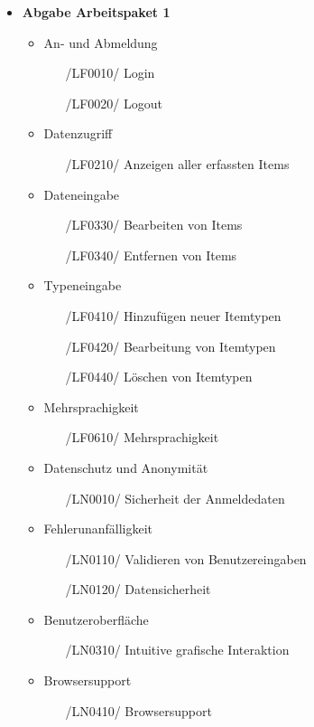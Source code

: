\documentclass[11pt,a4paper]{report}
\begin{document}
\begin{itemize}
\item
  \textbf{Abgabe Arbeitspaket 1}
  
  \begin{itemize}
  	\item
  		An- und Abmeldung
  		\begin{itemize}
  		\leftskip=3em
  		\item[/LF0010/] Login
  		\item[/LF0020/] Logout
  		\end{itemize}
    \item
    	Datenzugriff
    	\begin{itemize}
    	\leftskip=3em
    	\item[/LF0210/] Anzeigen aller erfassten Items
    	\end{itemize}
   \item
    	Dateneingabe
    	\begin{itemize}
    	\leftskip=3em
    	\item[/LF0330/] Bearbeiten von Items
    	\item[/LF0340/] Entfernen von Items
    	\end{itemize}
  \item
    	Typeneingabe
    	\begin{itemize}
    	\leftskip=3em
    	\item[/LF0410/] Hinzufügen neuer Itemtypen
    	\item[/LF0420/] Bearbeitung von Itemtypen
    	\item[/LF0440/] Löschen von Itemtypen
    	\end{itemize}
  \item
  		Mehrsprachigkeit
  	\begin{itemize}
  	\leftskip=3em
  	\item[/LF0610/] Mehrsprachigkeit
  	\end{itemize}
  \item
  	Datenschutz und Anonymität
  	\begin{itemize}
  	\leftskip=3em
  	\item[/LN0010/] Sicherheit der Anmeldedaten
  	\end{itemize}
  \item
  	Fehlerunanfälligkeit
  	\begin{itemize}
  	\leftskip=3em
  	\item[/LN0110/] Validieren von Benutzereingaben
  	\item[/LN0120/] Datensicherheit
  	\end{itemize}
  \item
  	Benutzeroberfläche
  	\begin{itemize}
  	\leftskip=3em
  	\item[/LN0310/] Intuitive grafische Interaktion
  	\end{itemize}
  \item
  	Browsersupport
  	\begin{itemize}
  	\leftskip=3em
  	\item[/LN0410/] Browsersupport
  	\end{itemize}
  \end{itemize}


\end{itemize}
\end{document}
